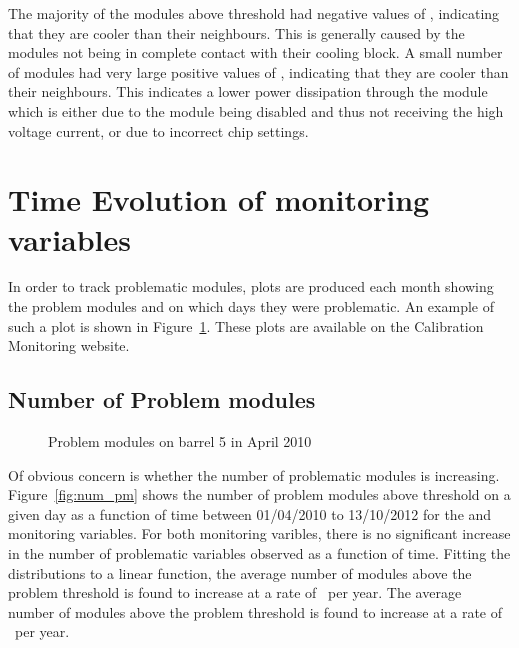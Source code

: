 The majority of the modules above threshold had negative values of \tdiff, indicating that they are cooler than their neighbours. This is generally caused by the modules not being in complete contact with their cooling block. A small number of modules had very large positive values of \tdiff, indicating that they are cooler than their neighbours. This indicates a lower power dissipation through the module which is either due to the module being disabled and thus not receiving the high voltage current, or due to incorrect chip settings.

\section{Time Evolution of monitoring variables}

In order to track problematic modules, plots are produced each month showing the problem modules and on which days they were problematic. An example of such a plot is shown in Figure~\ref{fig:pm_april}. These plots are available on the Calibration Monitoring website.

\subsection{Number of Problem modules}

\begin{figure}
	\centering


	\caption{Problem modules on barrel 5 in April 2010}
	\label{fig:pm_april}
\end{figure}
 
Of obvious concern is whether the number of problematic modules is increasing.
Figure~\ref{fig:num_pm} shows the number of problem modules above threshold on a
given day as a function of time between 01/04/2010 to 13/10/2012 for the \deltat
and \tdiff monitoring variables. For both monitoring varibles, there is no
significant increase in the number of problematic variables observed as a
function of time. Fitting the distributions to a linear function, the average
number of \tdiff modules above the problem threshold is found to increase at a rate
of \NumHighTdiffModulesIncreaseRate\ per year. The average number of \deltat
modules above the problem threshold is found to increase at a rate of
\NumHighDeltaTModulesIncreaseRate\ per year.

